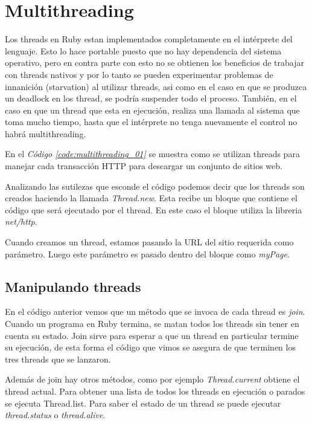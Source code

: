 \documentclass{article}
\newcommand{\refcode}[1]{\textit{Código \ref{#1}}}
\begin{document}
\section{Multithreading}

	Los threads en Ruby estan implementados completamente en el intérprete del lenguaje. Esto lo hace portable puesto que no hay dependencia del sistema operativo, pero en contra parte con esto no se obtienen los beneficios de trabajar con threads nativos y por lo tanto se pueden experimentar problemas de innanición (starvation) al utilizar threads, asi como en el caso en que se produzca un deadlock en los thread, se podría suspender todo el proceso. También, en el caso en que un thread que esta en ejecución, realiza una llamada al sistema que toma mucho tiempo, hasta que el intérprete no tenga nuevamente el control no habrá multithreading.
	\par
	En el \refcode{code:multithreading_01} se muestra como se utilizan threads para manejar cada transacción HTTP para descargar un conjunto de sitios web.

 
\bigskip

	Analizando las sutilezas que esconde el código podemos decir que los threads son creados haciendo la llamada \textit{Thread.new}. Esta recibe un bloque que contiene el código que será ejecutado por el thread. En este caso el bloque utiliza la libreria \textit{net/http}.
	\par
	Cuando creamos un thread, estamos pasando la URL del sitio requerida como parámetro. Luego este parámetro es pasado dentro del bloque como \textit{myPage}.
\bigskip



\subsection{Manipulando threads}

	En el código anterior vemos que un método que se invoca de cada thread es \textit{join}. Cuando un programa en Ruby termina, se matan todos los threads sin tener en cuenta su estado. Join sirve para esperar a que un thread en particular termine su ejecución, de esta forma el código que vimos se asegura de que terminen los tres threads que se lanzaron.
	\par
	Además de join hay otros métodos, como por ejemplo \textit{Thread.current} obtiene el thread actual. Para obtener una lista de todos los threads en ejecución o parados se ejecuta Thread.list. Para saber el estado de un thread se puede ejecutar \textit{thread.status} o \textit{thread.alive}.
\bigskip
\end{document}
